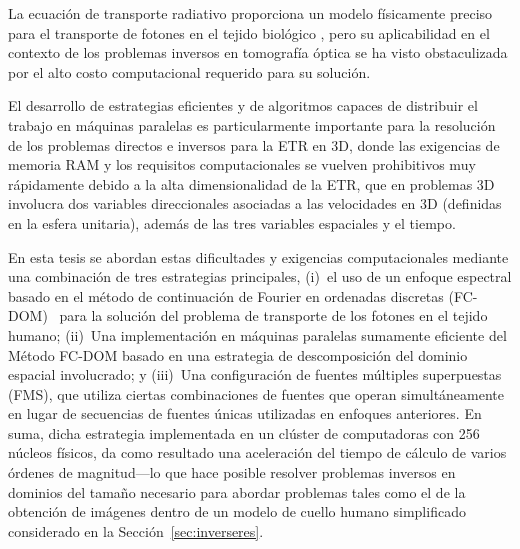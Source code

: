 La ecuación de transporte radiativo proporciona un
modelo físicamente preciso para el transporte de fotones en el tejido biológico
\cite{Klose2009, Arridge2009}, pero su aplicabilidad en el contexto de
los problemas inversos en tomografía óptica se ha visto obstaculizada por el alto costo computacional requerido para su solución. 

El desarrollo de estrategias eficientes y de algoritmos capaces de distribuir el trabajo en máquinas paralelas es particularmente importante para la
resolución de los problemas directos e inversos para la ETR en 3D, donde las exigencias 
de memoria RAM y
los requisitos computacionales se vuelven prohibitivos muy rápidamente
debido a la alta dimensionalidad de la ETR, que en problemas 3D
involucra dos variables direccionales asociadas a las velocidades en 3D (definidas 
en la esfera unitaria), además de las tres variables espaciales y el tiempo.

En esta tesis se abordan estas dificultades y exigencias computacionales 
mediante una combinación de tres estrategias principales, (i)~el uso de
un enfoque espectral basado en el método de continuación de Fourier 
en ordenadas discretas
(FC-DOM)~\cite{Gaggioli2019} para la solución del 
problema de transporte de los fotones en el tejido humano; (ii)~Una implementación 
en máquinas paralelas sumamente eficiente del
Método FC-DOM basado en una estrategia de descomposición del dominio espacial 
involucrado; y (iii)~Una configuración de fuentes múltiples superpuestas (FMS), que utiliza ciertas combinaciones de fuentes que operan simultáneamente en lugar de
secuencias de fuentes únicas utilizadas en enfoques anteriores. En suma, 
dicha estrategia 
implementada en un clúster de computadoras con 256 núcleos físicos, da como resultado una aceleración del tiempo de cálculo de varios órdenes de
magnitud---lo que hace posible resolver problemas inversos en dominios del 
tamaño necesario para abordar 
problemas tales como el de la obtención de imágenes dentro de un modelo de cuello
humano simplificado considerado en la Sección~\ref{sec:inverseres}.

